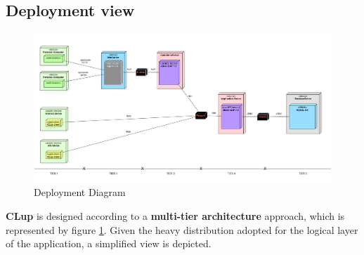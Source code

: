 \subsection{Deployment view}
\begin{figure}[H]
	\includegraphics[width=\linewidth]{../Diagrams/deployment_diagram.png}
	\caption{Deployment Diagram}
	\label{fig:DEPL}
\end{figure}
\textbf{CLup} is designed according to a \textbf{multi-tier architecture} approach, which is represented by figure \ref{fig:DEPL}. Given the heavy distribution adopted for the logical layer of the application, a simplified view is depicted.

